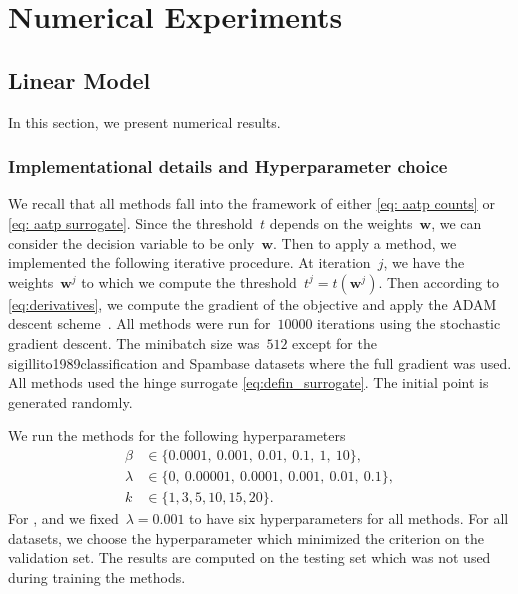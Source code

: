 \chapter{Numerical Experiments}\label{chap: experiments}


\section{Linear Model}\label{sec:num1}

In this section, we present numerical results.

\subsection{Implementational details and Hyperparameter choice}

We recall that all methods fall into the framework of either \eqref{eq: aatp counts} or \eqref{eq: aatp surrogate}. Since the threshold~$t$ depends on the weights~$\bm{w}$, we can consider the decision variable to be only~$\bm{w}$. Then to apply a method, we implemented the following iterative procedure. At iteration~$j$, we have the weights~$\bm{w}^j$ to which we compute the threshold~$t^j=t(\bm{w}^j)$. Then according to \eqref{eq:derivatives}, we compute the gradient of the objective and apply the ADAM descent scheme~\cite{kingma2014adam}. All methods were run for~$10000$ iterations using the stochastic gradient descent. The minibatch size was~$512$ except for the sigillito1989classification and Spambase datasets where the full gradient was used. All methods used the hinge surrogate \eqref{eq:defin_surrogate}. The initial point is generated randomly.

We run the methods for the following hyperparameters
\begin{equation}\label{eq:beta1}
  \begin{aligned}
    \beta   & \in  \{0.0001,\ 0.001,\ 0.01,\ 0.1,\ 1,\ 10\}, \\
    \lambda & \in \{0,\ 0.00001,\ 0.0001,\ 0.001,\ 0.01,\ 0.1\}, \\
    k       & \in \{1, 3, 5, 10, 15, 20\}.
  \end{aligned}
\end{equation}
For \TopPushK, \PatMat and \PatMatNP we fixed~$\lambda=0.001$ to have six hyperparameters for all methods. For all datasets, we choose the hyperparameter which minimized the criterion on the validation set. The results are computed on the testing set which was not used during training the methods.

